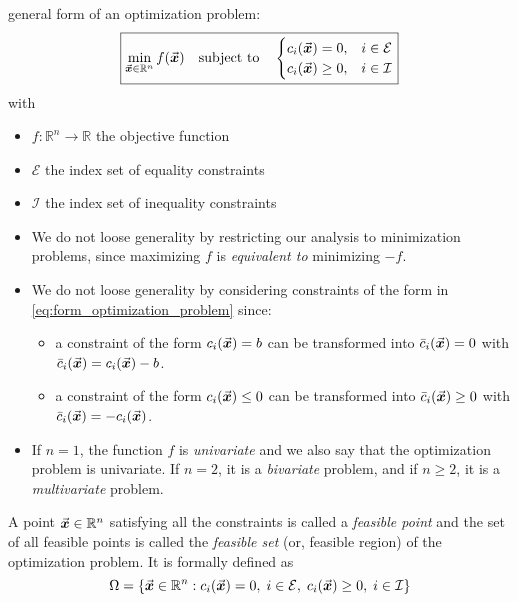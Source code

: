 general form of an optimization problem:
\begin{equation}
\label{eq:form_optimization_problem}
\boxed{
 \min_{\vec{\boldsymbol{x}} \in \mathbb{R}^{n}} f(\vec{\boldsymbol{x}}) \quad \text{subject to} \quad \begin{cases}c_{i}(\vec{\boldsymbol{x}})=0, & i \in \mathcal{E} \\ c_{i}(\vec{\boldsymbol{x}}) \geq 0, & i \in \mathcal{I}\end{cases}
 }
\end{equation}
with
\begin{itemize}
  \item \(f: \mathbb{R}^{n} \rightarrow \mathbb{R}\) the objective function
  \item \(\mathcal{E}\) the index set of equality constraints
  \item \(\mathcal{I}\) the index set of inequality constraints
\end{itemize}


\begin{remark}\leavevmode
  \begin{itemize}
    \item We do not loose generality by restricting our analysis to minimization problems, since maximizing \(f\) is \emph{equivalent to} minimizing \(-f\).
    \item We do not loose generality by considering constraints of the form in \eqref{eq:form_optimization_problem} since:
    \begin{itemize}
      \item a constraint of the form \(c_{i}(\vec{\boldsymbol{x}})=b\) can be transformed into \(\bar{c}_{i}(\vec{\boldsymbol{x}})=0\) with \(\bar{c}_{i}(\vec{\boldsymbol{x}})=c_{i}(\vec{\boldsymbol{x}})-b\).
      \item a constraint of the form \(c_{i}(\vec{\boldsymbol{x}}) \leq 0\) can be transformed into \(\bar{c}_{i}(\vec{\boldsymbol{x}}) \geq 0\) with \(\bar{c}_{i}(\vec{\boldsymbol{x}})=-c_{i}(\vec{\boldsymbol{x}})\).
    \end{itemize}
    \item If \(n=1\), the function \(f\) is \emph{univariate} and we also say that the optimization problem is univariate. If \(n=2\), it is a \emph{bivariate} problem, and if \(n \geq 2\), it is a \emph{multivariate} problem. \qedhere
  \end{itemize}
\end{remark}

A point \(\vec{\boldsymbol{x}}\in\mathbb{R}^{n}\) satisfying all the constraints is called a \emph{feasible point} and the set of all feasible points is called the \emph{feasible set} (or, feasible region) of the optimization problem. It is formally defined as
\begin{equation}
  \label{eq:feasible_set}
\Omega = \left\{ \vec{\boldsymbol{x}}\in\mathbb{R}^{n} : c_{i}(\vec{\boldsymbol{x}})=0,\; i\in\mathcal{E},\; c_{i}(\vec{\boldsymbol{x}})\geq 0,\; i\in\mathcal{I} \right\}
\end{equation}

